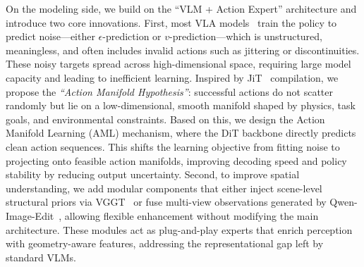 On the modeling side, we build on the ``VLM + Action Expert'' architecture and introduce two core innovations. First, most VLA models~\cite{GR00T,team2024octo,li2024cogact,reuss2025flower} train the policy to predict noise---either $\epsilon$-prediction or $v$-prediction---which is unstructured, meaningless, and often includes invalid actions such as jittering or discontinuities. These noisy targets spread across high-dimensional space, requiring large model capacity and leading to inefficient learning. Inspired by JiT~\cite{JIT} compilation, we propose the \textit{``Action Manifold Hypothesis''}: successful actions do not scatter randomly but lie on a low-dimensional, smooth manifold shaped by physics, task goals, and environmental constraints. Based on this, we design the Action Manifold Learning (AML) mechanism, where the DiT backbone directly predicts clean action sequences. This shifts the learning objective from fitting noise to projecting onto feasible action manifolds, improving decoding speed and policy stability by reducing output uncertainty. Second, to improve spatial understanding, we add modular components that either inject scene-level structural priors via VGGT~\cite{wang2025vggt} or fuse multi-view observations generated by Qwen-Image-Edit~\cite{wu2025qwenimagetechnicalreport}, allowing flexible enhancement without modifying the main architecture. These modules act as plug-and-play experts that enrich perception with geometry-aware features, addressing the representational gap left by standard VLMs.

